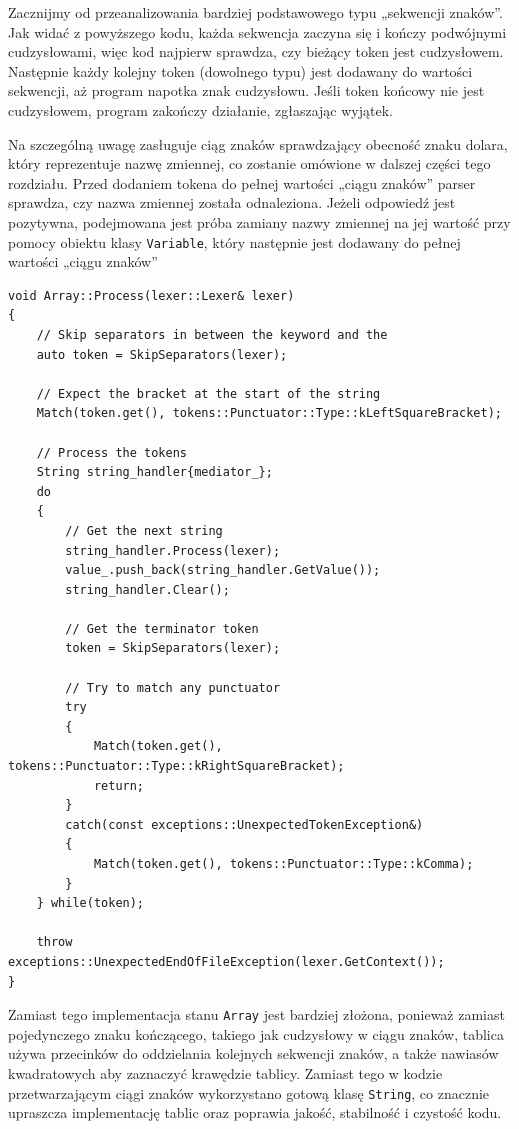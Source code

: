 Zacznijmy od przeanalizowania bardziej podstawowego typu „sekwencji znaków”. Jak widać z powyższego kodu, każda sekwencja zaczyna się i kończy podwójnymi cudzysłowami, więc kod najpierw sprawdza, czy bieżący token jest cudzysłowem. Następnie każdy kolejny token (dowolnego typu) jest dodawany do wartości sekwencji, aż program napotka znak cudzysłowu. Jeśli token końcowy nie jest cudzysłowem, program zakończy działanie, zgłaszając wyjątek.

Na szczególną uwagę zasługuje ciąg znaków sprawdzający obecność znaku dolara, który reprezentuje nazwę zmiennej, co zostanie omówione w dalszej części tego rozdziału. Przed dodaniem tokena do pełnej wartości „ciągu znaków” parser sprawdza, czy nazwa zmiennej została odnaleziona. Jeżeli odpowiedź jest pozytywna, podejmowana jest próba zamiany nazwy zmiennej na jej wartość przy pomocy obiektu klasy \texttt{Variable}, który następnie jest dodawany do pełnej wartości „ciągu znaków”


\begin{lstlisting}[label=list:array,caption=Metoda Array::Process(),basicstyle=\footnotesize\ttfamily]
void Array::Process(lexer::Lexer& lexer)
{
    // Skip separators in between the keyword and the
    auto token = SkipSeparators(lexer);

    // Expect the bracket at the start of the string
    Match(token.get(), tokens::Punctuator::Type::kLeftSquareBracket);

    // Process the tokens
    String string_handler{mediator_};
    do
    {
        // Get the next string
        string_handler.Process(lexer);
        value_.push_back(string_handler.GetValue());
        string_handler.Clear();

        // Get the terminator token
        token = SkipSeparators(lexer);

        // Try to match any punctuator
        try
        {
            Match(token.get(), tokens::Punctuator::Type::kRightSquareBracket);
            return;
        }
        catch(const exceptions::UnexpectedTokenException&)
        {
            Match(token.get(), tokens::Punctuator::Type::kComma);
        }
    } while(token);

    throw exceptions::UnexpectedEndOfFileException(lexer.GetContext());
}
\end{lstlisting}

Zamiast tego implementacja stanu \texttt{Array} jest bardziej złożona, ponieważ zamiast pojedynczego znaku kończącego, takiego jak cudzysłowy w ciągu znaków, tablica używa przecinków do oddzielania kolejnych sekwencji znaków, a także nawiasów kwadratowych aby zaznaczyć krawędzie tablicy. Zamiast tego w kodzie przetwarzającym ciągi znaków wykorzystano gotową klasę \texttt{String}, co znacznie upraszcza implementację tablic oraz poprawia jakość, stabilność i czystość kodu.

